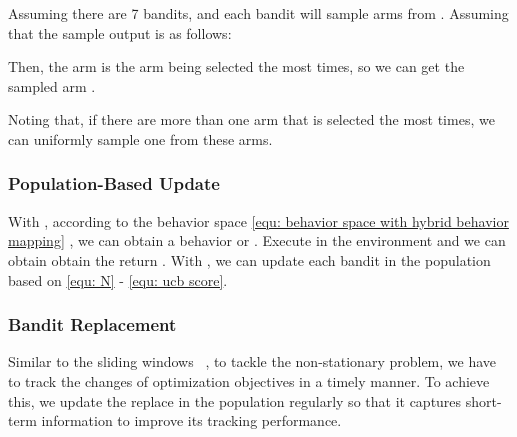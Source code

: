 \begin{Example}
    Assuming there are 7 bandits, and each bandit will sample  arms from . Assuming that the sample output is as follows:
    
    Then, the arm  is the arm being selected the most times, so we can get the sampled arm . 
\end{Example}

\begin{Remark}
    Noting that, if there are more than one arm that is selected the most times, we can uniformly sample one from these arms.
\end{Remark}

\subsubsection{Population-Based Update}
With , according to the behavior space \eqref{equ: behavior space with hybrid behavior mapping} , we can obtain a behavior  or .  Execute  in the environment and we can obtain obtain the return . With , we can update each bandit in the population based on \eqref{equ: N} - \eqref{equ: ucb score}.

\subsubsection{Bandit Replacement}
Similar to the sliding windows ~\citep{agent57}, to tackle the  non-stationary  problem, we have to track the changes of optimization objectives in a timely manner. To achieve this, we update the replace in the population regularly so that it captures short-term information to improve its tracking performance. 

